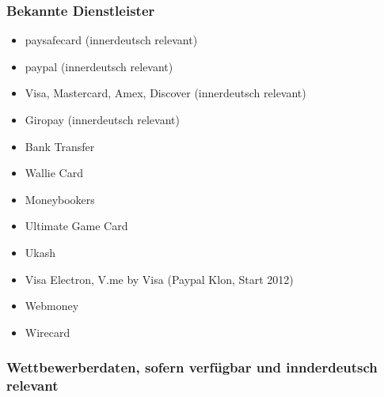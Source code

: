 
\subsubsection{Bekannte Dienstleister}

\begin{itemize}
 \item paysafecard (innerdeutsch relevant)
 \item paypal   (innerdeutsch relevant)
 \item Visa, Mastercard, Amex, Discover (innerdeutsch relevant)
 \item Giropay (innerdeutsch relevant)
 \item Bank Transfer
 \item Wallie Card
 \item Moneybookers
 \item Ultimate Game Card
 \item Ukash
 \item Visa Electron, V.me by Visa (Paypal Klon, Start 2012)
 \item Webmoney
 \item Wirecard
\end{itemize}
 


\subsubsection{Wettbewerberdaten, sofern verfügbar und innderdeutsch relevant}


